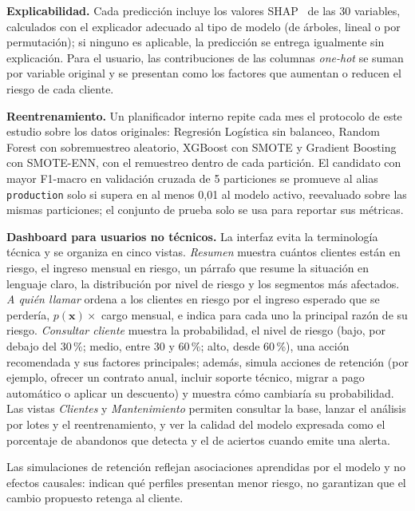 \documentclass[conference]{IEEEtran}
\begin{document}
\textbf{Explicabilidad.} Cada predicción incluye los valores SHAP~\cite{lundberg2017shap} de las 30 variables, calculados con el explicador adecuado al tipo de modelo (de árboles, lineal o por permutación); si ninguno es aplicable, la predicción se entrega igualmente sin explicación. Para el usuario, las contribuciones de las columnas \emph{one-hot} se suman por variable original y se presentan como los factores que aumentan o reducen el riesgo de cada cliente.

\textbf{Reentrenamiento.} Un planificador interno repite cada mes el protocolo de este estudio sobre los datos originales: Regresión Logística sin balanceo, Random Forest con sobremuestreo aleatorio, XGBoost con SMOTE y Gradient Boosting con SMOTE-ENN, con el remuestreo dentro de cada partición. El candidato con mayor F1-macro en validación cruzada de 5 particiones se promueve al alias \texttt{production} solo si supera en al menos 0,01 al modelo activo, reevaluado sobre las mismas particiones; el conjunto de prueba solo se usa para reportar sus métricas.

\textbf{Dashboard para usuarios no técnicos.} La interfaz evita la terminología técnica y se organiza en cinco vistas. \emph{Resumen} muestra cuántos clientes están en riesgo, el ingreso mensual en riesgo, un párrafo que resume la situación en lenguaje claro, la distribución por nivel de riesgo y los segmentos más afectados. \emph{A quién llamar} ordena a los clientes en riesgo por el ingreso esperado que se perdería, $p(\mathbf{x})\times$ cargo mensual, e indica para cada uno la principal razón de su riesgo. \emph{Consultar cliente} muestra la probabilidad, el nivel de riesgo (bajo, por debajo del 30\,\%; medio, entre 30 y 60\,\%; alto, desde 60\,\%), una acción recomendada y sus factores principales; además, simula acciones de retención (por ejemplo, ofrecer un contrato anual, incluir soporte técnico, migrar a pago automático o aplicar un descuento) y muestra cómo cambiaría su probabilidad. Las vistas \emph{Clientes} y \emph{Mantenimiento} permiten consultar la base, lanzar el análisis por lotes y el reentrenamiento, y ver la calidad del modelo expresada como el porcentaje de abandonos que detecta y el de aciertos cuando emite una alerta.

Las simulaciones de retención reflejan asociaciones aprendidas por el modelo y no efectos causales: indican qué perfiles presentan menor riesgo, no garantizan que el cambio propuesto retenga al cliente.

\end{document}
